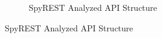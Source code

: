 \begin{figure}
  \begin{subfigure}[b]{\textwidth}
    \caption{SpyREST Analyzed API Structure}
    \label{fig:screenshot_fields}
  \end{subfigure}
\end{figure}
